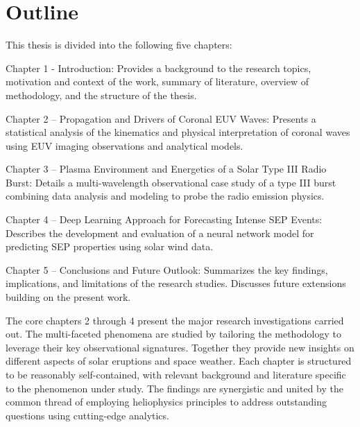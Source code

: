 \section{Outline}
This thesis is divided into the following five chapters:

Chapter 1 - Introduction: Provides a background to the research topics, motivation and context of the work, summary of literature, overview of methodology, and the structure of the thesis. 

Chapter 2 – Propagation and Drivers of Coronal EUV Waves: Presents a statistical analysis of the kinematics and physical interpretation of coronal waves using EUV imaging observations and analytical models.

Chapter 3 – Plasma Environment and Energetics of a Solar Type III Radio Burst: Details a multi-wavelength observational case study of a type III burst combining data analysis and modeling to probe the radio emission physics. 

Chapter 4 – Deep Learning Approach for Forecasting Intense SEP Events: Describes the development and evaluation of a neural network model for predicting SEP properties using solar wind data.

Chapter 5 – Conclusions and Future Outlook: Summarizes the key findings, implications, and limitations of the research studies. Discusses future extensions building on the present work.

The core chapters 2 through 4 present the major research investigations carried out. The multi-faceted phenomena are studied by tailoring the methodology to leverage their key observational signatures. Together they provide new insights on different aspects of solar eruptions and space weather. Each chapter is structured to be reasonably self-contained, with relevant background and literature specific to the phenomenon under study. The findings are synergistic and united by the common thread of employing heliophysics principles to address outstanding questions using cutting-edge analytics.


